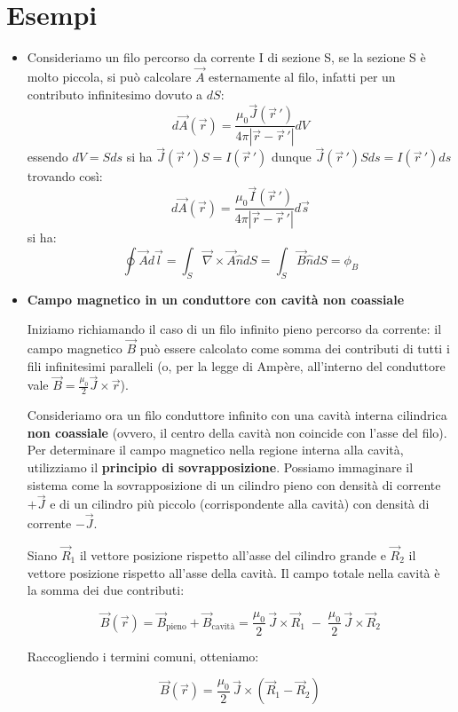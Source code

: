 \documentclass{book}
\begin{document}
\section{Esempi}


\begin{itemize}
\item Consideriamo un filo percorso da corrente I di sezione S, 
se la sezione S è molto piccola, si può calcolare $\vec{A}$ esternamente al filo, infatti per un contributo infinitesimo dovuto a $dS$:
$$
d\vec{A}(\vec{r})=  \frac{\mu_0 \vec{J}(\vec{r}\,')}{4\pi |\vec{r}-\vec{r}\,'|} dV
$$
essendo $dV = Sds$ si ha $\vec{J}(\vec{r}\,')S=I(\vec{r}\,')$
dunque $ \vec{J}(\vec{r}\,')Sds=I(\vec{r}\,')ds$ trovando così:
$$
d\vec{A}(\vec{r})=  \frac{\mu_0 \vec{I}(\vec{r}\,')}{4\pi |\vec{r}-\vec{r}\,'|} d\vec{s}
$$
si ha:
$$
\oint \vec{A}d\vec{l}= \int_S \vec{\nabla}\times \vec{A}\hat{n}dS = \int_S \vec{B}\hat{n}dS = \phi_B    
$$

 
\item 
\textbf{Campo magnetico in un conduttore con cavità non coassiale}

Iniziamo richiamando il caso di un filo infinito pieno percorso da corrente: il campo magnetico $\vec{B}$ può essere calcolato come somma dei contributi di tutti i fili infinitesimi paralleli (o, per la legge di Ampère, all'interno del conduttore vale $\vec{B} = \frac{\mu_0}{2} \vec{J} \times \vec{r}$).

Consideriamo ora un filo conduttore infinito con una cavità interna cilindrica \textbf{non coassiale} (ovvero, il centro della cavità non coincide con l'asse del filo). Per determinare il campo magnetico nella regione interna alla cavità, utilizziamo il \textbf{principio di sovrapposizione}. Possiamo immaginare il sistema come la sovrapposizione di un cilindro pieno con densità di corrente $+\vec{J}$ e di un cilindro più piccolo (corrispondente alla cavità) con densità di corrente $-\vec{J}$.

Siano $\vec{R}_1$ il vettore posizione rispetto all'asse del cilindro grande e $\vec{R}_2$ il vettore posizione rispetto all'asse della cavità. Il campo totale nella cavità è la somma dei due contributi:

$$
\vec{B}(\vec{r}) = \vec{B}_{\text{pieno}} + \vec{B}_{\text{cavità}} = \frac{\mu_0}{2}\,\vec{J}\times\vec{R}_1 \;-\; \frac{\mu_0}{2}\,\vec{J}\times\vec{R}_2
$$

Raccogliendo i termini comuni, otteniamo:

$$
\vec{B}(\vec{r}) = \frac{\mu_0}{2}\,\vec{J}\times (\vec{R}_1 - \vec{R}_2 )
$$


\end{itemize}
\end{document}
